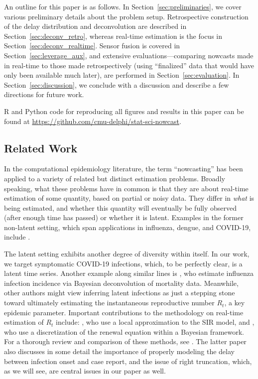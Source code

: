 \documentclass[sts]{imsart}
\theoremstyle{plain}
\theoremstyle{definition}
\theoremstyle{remark}
\begin{document}
An outline for this paper is as follows. In Section~\ref{sec:preliminaries}, we
cover various preliminary details about the problem setup. Retrospective
construction of the delay distribution and deconvolution are described in
Section~\ref{sec:deconv_retro}, whereas real-time estimation is the focus in
Section~\ref{sec:deconv_realtime}. Sensor fusion is covered in
Section~\ref{sec:leverage_aux}, and extensive evaluations---comparing nowcasts
made in real-time to those made retrospectively (using ``finalized'' data that
would have only been available much later), are performed in
Section~\ref{sec:evaluation}. In Section~\ref{sec:discussion}, we conclude with
a discussion and describe a few directions for future work. 

R and Python code
for reproducing all figures and results in this paper can be found at
\url{https://github.com/cmu-delphi/stat-sci-nowcast}. 

\subsection{Related Work}
\label{sec:related_work}

In the computational epidemiology literature, the term ``nowcasting'' has been
applied to a variety of related but distinct estimation problems. Broadly
speaking, what these problems have in common is that they are about real-time
estimation of some quantity, based on partial or noisy data. They differ in
\emph{what} is being estimated, and whether this quantity will eventually be
fully observed (after enough time has passed) or whether it is latent. Examples
in the former non-latent setting, which span applications in influenza, dengue,
and COVID-19, include \citet{Yang:2015, Farrow:2016, Jahja:2019, Brooks:2020,
  McGough:2020, Hawryluk:2021}. 

The latent setting exhibits another degree of diversity within itself. In our
work, we target symptomatic COVID-19 infections, which, to be perfectly clear,
is a latent time series. Another example along similar lines is
\citet{Goldstein:2009}, who estimate influenza infection incidence via Bayesian
deconvolution of mortality data. Meanwhile, other authors might view inferring 
latent infections as just a stepping stone toward ultimately estimating the 
instantaneous reproductive number $R_t$, a key epidemic parameter. Important 
contributions to the methodology on real-time estimation of $R_t$ include: 
\citet{Bettencourt:2008}, who use a local approximation to the SIR model, and 
\citet{Cori:2013, Thompson:2019}, who use a discretization of the renewal
equation within a Bayesian framework. For a thorough review and comparison of
these methods, see \citet{Gostic:2020}. The latter paper also discusses in some
detail the importance of properly modeling the delay between infection onset and
case report, and the issue of right truncation, which, as we will see, are
central issues in our paper as well. 
\end{document}
